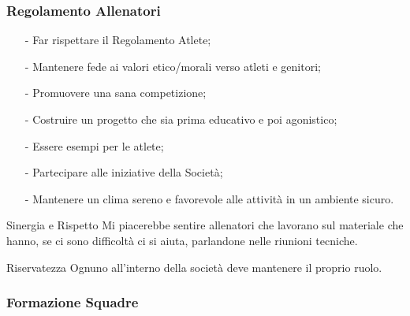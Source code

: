 \documentclass{beamer}
\begin{document}
\begin{frame}
\frametitle{Regolamento Allenatori}
\begin{itemize}[<+->]
\item[-]Far rispettare il Regolamento Atlete;
\item[-]Mantenere fede ai valori etico/morali verso atleti e genitori;
\item[-]Promuovere una sana competizione;
\item[-]Costruire un progetto che sia prima educativo e poi agonistico;
\item[-]Essere esempi per le atlete;
\item[-]Partecipare alle iniziative della Società;
\item[-]Mantenere un clima sereno e favorevole alle attività in un ambiente sicuro.
\end{itemize}

\pause
\begin{block}{Sinergia e Rispetto}
Mi piacerebbe sentire allenatori che lavorano sul materiale che hanno, se ci sono difficoltà ci si aiuta, parlandone nelle riunioni tecniche.
\end{block}
\pause
\begin{alertblock}{Riservatezza}
Ognuno all'interno della società deve mantenere il proprio ruolo. 
\end{alertblock}
\end{frame}

\begin{frame}
\frametitle{Formazione Squadre}

\end{frame}
\end{document}
